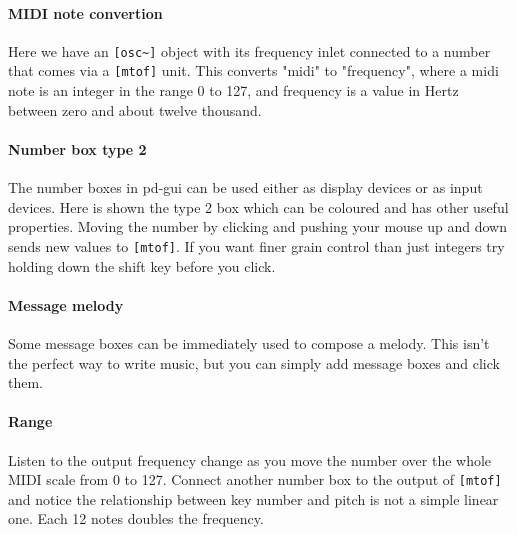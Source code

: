 \paragraph{MIDI note convertion}
Here we have an \verb+[osc~]+ object with its frequency inlet connected to a number 
that comes via a \verb+[mtof]+ unit. This converts "midi" to "frequency", where
a midi note is an integer in the range 0 to 127, and frequency is a value
in Hertz between zero and about twelve thousand. 

\paragraph{Number box type 2}
The number boxes in pd-gui can be used either as display devices or as
input devices. Here is shown the type 2 box which can be coloured and
has other useful properties. Moving the number by clicking and pushing your mouse
up and down sends new values to \verb+[mtof]+. If you want finer grain
control than just integers try holding down the shift key before you click.

\paragraph{Message melody}
Some message boxes can be immediately used to compose a melody. This isn't
the perfect way to write music, but you can simply add message boxes and 
click them.


\paragraph{Range}
Listen to the output frequency change as you move the number over the whole
MIDI scale from 0 to 127. Connect another number box to the output of \verb+[mtof]+
and notice the relationship between key number and pitch is not a simple
linear one. Each 12 notes doubles the frequency.

